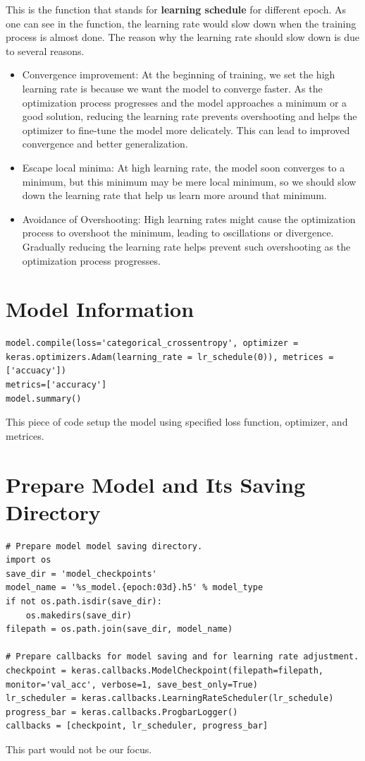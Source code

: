 \documentclass[12pt]{report}
\numberwithin{equation}{section}
\begin{document}
This is the function that stands for \textbf{learning schedule} for different epoch. 
As one can see in the function, the learning rate would slow down when the training process is almost done.
The reason why the learning rate should slow down is due to several reasons. 
\begin{itemize}
    \item Convergence improvement: At the beginning of training, we set the high learning rate is because we want the model to converge faster.  As the optimization process progresses and the model approaches a minimum or a good solution, reducing the learning rate prevents overshooting and helps the optimizer to fine-tune the model more delicately. This can lead to improved convergence and better generalization.
    \item Escape local minima: At high learning rate, the model soon converges to a minimum, but this minimum may be mere local minimum, so we should slow down the learning rate that help us learn more around that minimum.
    \item Avoidance of Overshooting: High learning rates might cause the optimization process to overshoot the minimum, leading to oscillations or divergence. Gradually reducing the learning rate helps prevent such overshooting as the optimization process progresses.
\end{itemize}

\section{Model Information}
\begin{lstlisting}
model.compile(loss='categorical_crossentropy', optimizer = keras.optimizers.Adam(learning_rate = lr_schedule(0)), metrices = ['accuacy'])
metrics=['accuracy']
model.summary()
\end{lstlisting}
This piece of code setup the model using specified loss function, optimizer, and metrices.

\section{Prepare Model and Its Saving Directory}
\begin{lstlisting}
# Prepare model model saving directory.
import os
save_dir = 'model_checkpoints'
model_name = '%s_model.{epoch:03d}.h5' % model_type
if not os.path.isdir(save_dir):
    os.makedirs(save_dir)
filepath = os.path.join(save_dir, model_name)

# Prepare callbacks for model saving and for learning rate adjustment.
checkpoint = keras.callbacks.ModelCheckpoint(filepath=filepath, monitor='val_acc', verbose=1, save_best_only=True)
lr_scheduler = keras.callbacks.LearningRateScheduler(lr_schedule)
progress_bar = keras.callbacks.ProgbarLogger()
callbacks = [checkpoint, lr_scheduler, progress_bar]
\end{lstlisting}
This part would not be our focus.\\\\\\
\end{document}
